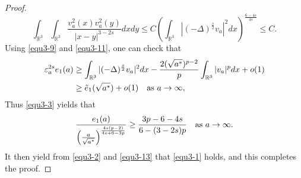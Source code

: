 \documentclass[reqno, 11pt]{amsart} %
\numberwithin{equation}{section}
\begin{document}
\begin{proof}
\begin{equation}
			\int_{\mathbb{R}^{3}}\int_{\mathbb{R}^{3}}\frac{v_{a}^{2}(x)v_{a}^{2}(y)}{|x-y|^{3-2s}}dxdy\leq C\left( \int_{\mathbb{R}^{3}}|(-\Delta)^{\frac{s}{2}}  v_{a}|^{2}dx\right)^{\frac{6-4s}{4s}}\leq C.
		\end{equation}
		Using \eqref{equ3-9} and \eqref{equ3-11}, one can check that
		\begin{equation}\label{equ3-12}
			\begin{split}
				\varepsilon_{a}^{2s}e_{1}(a)&\geq\int_{\mathbb{R}^{3}}|(-\Delta)^{\frac{s}{2}}  v_{a}|^{2}dx-\frac{2(\sqrt{a^{\ast}})^{p-2}}{p}\int_{\mathbb{R}^{3}}|v_{a}|^{p}dx+o(1)\\
				&\geq\tilde{e}_{1}(\sqrt{a^{\ast}})+o(1)\quad \hbox{as $a\rightarrow\infty$},
			\end{split}
		\end{equation}
		Thus \eqref{equ3-3} yields that
		\begin{equation}\label{equ3-13}
			\frac{e_{1}(a)}{\left(\frac{a}{\sqrt{a^{\ast}}}\right)^{\frac{4s(p-2)}{4s+6-3p}}}\geq\frac{3p-6-4s}{6-(3-2s)p}\quad \hbox{as $a\rightarrow\infty$}.
		\end{equation}
		It then yield from \eqref{equ3-2} and \eqref{equ3-13} that \eqref{equ3-1} holds, and this completes the proof.
	\end{proof}
	
\end{document}
